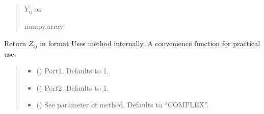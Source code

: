 \documentclass[letterpaper,10pt,english]{sphinxmanual}
\begin{document}
\begin{fulllineitems}
\begin{fulllineitems}
\begin{quote}
\begin{description}
\begin{itemize}
\end{itemize}

\sphinxAtStartPar
\(Y_{i j}\) as 

\sphinxAtStartPar
numpy.array

\end{description}\end{quote}

\end{fulllineitems}


\begin{fulllineitems}
\label{\detokenize{touchstone:touchstone.spfile.Z}}
\pysigstartsignatures
{}
\pysigstopsignatures
\sphinxAtStartPar
Return \(Z_{i j}\) in format 
Uses  method internally. A convenience function for practical use.
\begin{quote}\begin{description}
\begin{itemize}
\item {} 
\sphinxAtStartPar
{} (\sphinxstyleliteralemphasis{\sphinxupquote{, }}) \textendash{} Port\sphinxhyphen{}1. Defaults to 1.

\item {} 
\sphinxAtStartPar
{} (\sphinxstyleliteralemphasis{\sphinxupquote{, }}) \textendash{} Port\sphinxhyphen{}2. Defaults to 1.

\item {} 
\sphinxAtStartPar
{} (\sphinxstyleliteralemphasis{\sphinxupquote{, }}) \textendash{} See  parameter of  method. Defaults to “COMPLEX”.


\end{itemize}
\end{description}
\end{quote}
\end{fulllineitems}
\end{fulllineitems}
\end{document}
